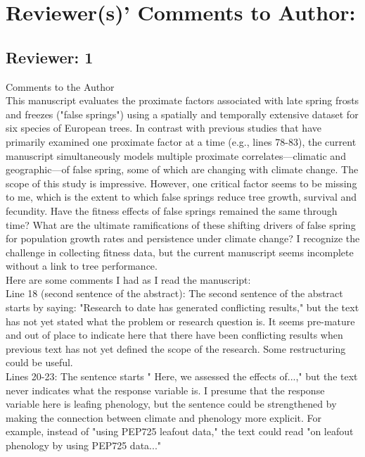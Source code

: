 \documentclass[11pt,a4paper]{article}
\begin{document}


\section*{Reviewer(s)' Comments to Author:}

\subsection*{Reviewer: 1}

Comments to the Author \\
This manuscript evaluates the proximate factors associated with late spring frosts and freezes ("false springs") using a spatially and temporally extensive dataset for six species of European trees. In contrast with previous studies that have primarily examined one proximate factor at a time (e.g., lines 78-83), the current manuscript simultaneously models multiple proximate correlates---climatic and geographic---of false spring, some of which are changing with climate change. The scope of this study is impressive. However, one critical factor seems to be missing to me, which is the extent to which false springs reduce tree growth, survival and fecundity. Have the fitness effects of false springs remained the same through time? What are the ultimate ramifications of these shifting drivers of false spring for population growth rates and persistence under climate change? I recognize the challenge in collecting fitness data, but the current manuscript seems incomplete without a link to tree performance.\\

Here are some comments I had as I read the manuscript:\\


Line 18 (second sentence of the abstract): The second sentence of the abstract starts by saying: "Research to date has generated conflicting results," but the text has not yet stated what the problem or research question is. It seems pre-mature and out of place to indicate here that there have been conflicting results when previous text has not yet defined the scope of the research. Some restructuring could be useful.\\

Lines 20-23: The sentence starts " Here, we assessed the effects of...," but the text never indicates what the response variable is. I presume that the response variable here is leafing phenology, but the sentence could be strengthened by making the connection between climate and phenology more explicit. For example, instead of "using PEP725 leafout data," the text could read "on leafout phenology by using PEP725 data..."\\
\end{document}
